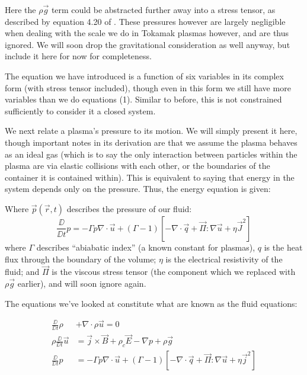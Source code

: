\begin{remark}
    Here the $\rho \vec{g}$ term could be abstracted further away into a stress tensor, as described by equation 4.20 of \cite{mhd-lectures}. These 
    pressures however are largely negligible when dealing with the scale we do in Tokamak plasmas however, and 
    are thus ignored. We will soon drop the gravitational consideration as well anyway, but include it here for now for completeness.
\end{remark}

\begin{remark}
    The equation we have introduced is a function of six variables in its complex form (with stress tensor 
    included), though even in this form we still have more variables than we do equations (1). Similar to before, this 
    is not constrained sufficiently to consider it a closed system.
\end{remark}

We next relate a plasma's pressure to its motion. We will simply present it here, though important notes in its 
derivation are that we assume the plasma behaves as an ideal gas (which is to say the only interaction 
between particles within the plasma are via elastic collisions with each other, or the boundaries of the container 
it is contained within). This is equivalent to saying that energy in the system depends only on the pressure. Thus, the 
energy equation is given:
\begin{definition}
    Where $\vec{p}(\vec{r}, t)$ describes the pressure of our fluid:
    \begin{equation}
        \frac{\DD}{\DD t} p  = -\Gamma p \nabla \cdot \vec{u} + (\Gamma - 1) \left [ -\nabla \cdot \vec{q} + \vec{\Pi} : \nabla \vec{u} + \eta \vec{J}^2 \right ]
    \end{equation}
    where $\Gamma$ describes ``abiabatic index'' (a known constant for plasmas), $q$ is the heat flux through 
    the boundary of the volume; $\eta$ is the electrical resistivity of the fluid; and $\vec{\Pi}$ is the viscous 
    stress tensor (the component which we replaced with $\rho \vec{g}$ earlier), and will soon ignore again. 
\end{definition}



The equations we've looked at constitute what are known as the fluid equations:

\begin{definition}
    \begin{align}
        \frac{\DD}{\DD t} \rho &+ \nabla  \cdot \rho \vec{u} = 0 \\
        \rho \frac{\DD}{\DD t} \vec{u} &=  \vec{j} \times \vec{B} + \rho_c \vec{E} - \nabla p + \rho \vec{g} \\
        \frac{\DD}{\DD t} p  &= -\Gamma p \nabla \cdot \vec{u} + (\Gamma - 1) \left [ -\nabla \cdot \vec{q} + \vec{\Pi} : \nabla \vec{u} + \eta \vec{j}^2 \right ]
    \end{align}
\end{definition}

